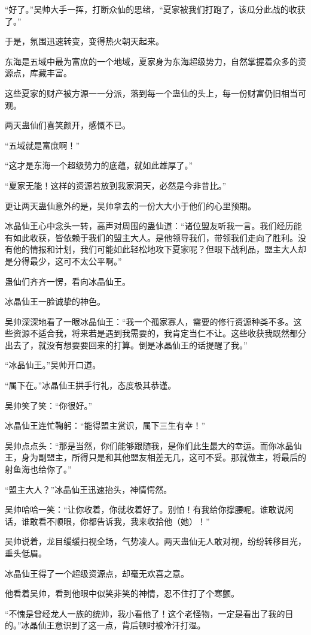 \begin{this_body}
“好了。”吴帅大手一挥，打断众仙的思绪，“夏家被我们打跑了，该瓜分此战的收获了。”

于是，氛围迅速转变，变得热火朝天起来。

东海是五域中最为富庶的一个地域，夏家身为东海超级势力，自然掌握着众多的资源点，库藏丰富。

这些夏家的财产被方源一一分派，落到每一个蛊仙的头上，每一份财富仍旧相当可观。

两天蛊仙们喜笑颜开，感慨不已。

“五域就是富庶啊！”

“这才是东海一个超级势力的底蕴，就如此雄厚了。”

“夏家无能！这样的资源若放到我家洞天，必然是今非昔比。”

更让两天蛊仙意外的是，吴帅拿去的一份大大小于他们的心里预期。

冰晶仙王心中念头一转，高声对周围的蛊仙道：“诸位盟友听我一言。我们经历能有如此收获，皆依赖于我们的盟主大人。是他领导我们，带领我们走向了胜利。没有他的情报和计划，我们可能如此轻松地攻下夏家呢？但眼下战利品，盟主大人却是分得最少，这可不太公平啊。”

蛊仙们齐齐一愣，看向冰晶仙王。

冰晶仙王一脸诚挚的神色。

吴帅深深地看了一眼冰晶仙王：“我一个孤家寡人，需要的修行资源种类不多。这些资源不适合我，将来若是遇到我需要的，我肯定当仁不让。这些收获我既然都分出去了，就没有想要要回来的打算。倒是冰晶仙王的话提醒了我。”

“冰晶仙王。”吴帅开口道。

“属下在。”冰晶仙王拱手行礼，态度极其恭谨。

吴帅笑了笑：“你很好。”

冰晶仙王连忙鞠躬：“能得盟主赏识，属下三生有幸！”

吴帅点点头：“那是当然，你们能够跟随我，是你们此生最大的幸运。而你冰晶仙王，身为副盟主，所得只是和其他盟友相差无几，这可不妥。那就做主，将最后的射鱼海也给你了。”

“盟主大人？”冰晶仙王迅速抬头，神情愕然。

吴帅哈哈一笑：“让你收着，你就收着好了。别怕！有我给你撑腰呢。谁敢说闲话，谁敢看不顺眼，你都告诉我，我来收拾他（她）！”

吴帅说着，龙目缓缓扫视全场，气势凌人。两天蛊仙无人敢对视，纷纷转移目光，垂头低眉。

冰晶仙王得了一个超级资源点，却毫无欢喜之意。

他看着吴帅，看到他眼中似笑非笑的神情，忍不住打了个寒颤。

“不愧是曾经龙人一族的统帅，我小看他了！这个老怪物，一定是看出了我的目的。”冰晶仙王意识到了这一点，背后顿时被冷汗打湿。


\end{this_body}
